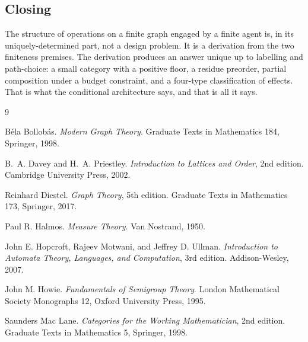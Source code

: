 \documentclass[11pt,twocolumn,a4paper]{article}
\theoremstyle{thmstyle}
\theoremstyle{definition}
\theoremstyle{remark}
\begin{document}
\subsection{Closing}

The structure of operations on a finite graph engaged by a finite
agent is, in its uniquely-determined part, not a design problem. It
is a derivation from the two finiteness premises. The derivation
produces an answer unique up to labelling and path-choice: a small
category with a positive floor, a residue preorder, partial
composition under a budget constraint, and a four-type
classification of effects. That is what the conditional
architecture says, and that is all it says.

\begin{thebibliography}{9}

 B\'ela Bollob\'as.
\emph{Modern Graph Theory}.
Graduate Texts in Mathematics 184, Springer, 1998.

B.~A. Davey and H.~A. Priestley.
\emph{Introduction to Lattices and Order}, 2nd edition.
Cambridge University Press, 2002.

 Reinhard Diestel.
\emph{Graph Theory}, 5th edition.
Graduate Texts in Mathematics 173, Springer, 2017.

 Paul R. Halmos.
\emph{Measure Theory}.
Van Nostrand, 1950.

John E. Hopcroft, Rajeev Motwani, and Jeffrey D. Ullman.
\emph{Introduction to Automata Theory, Languages, and Computation},
3rd edition. Addison-Wesley, 2007.

 John M. Howie.
\emph{Fundamentals of Semigroup Theory}.
London Mathematical Society Monographs 12, Oxford University Press,
1995.

 Saunders Mac Lane.
\emph{Categories for the Working Mathematician}, 2nd edition.
Graduate Texts in Mathematics 5, Springer, 1998.

\end{thebibliography}
\end{document}
